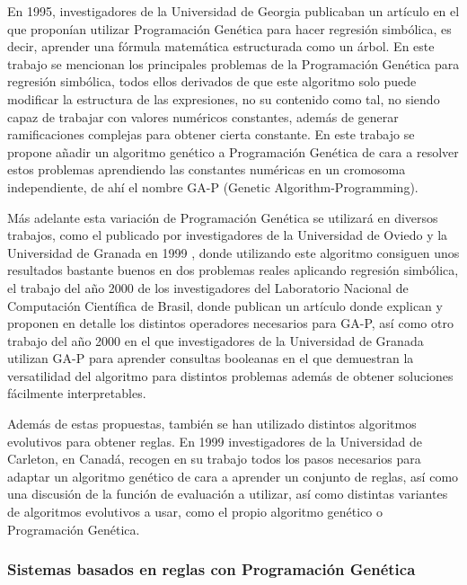 En 1995, investigadores de la Universidad de Georgia publicaban un artículo \cite{primerGAP} en el que proponían utilizar Programación Genética para hacer regresión simbólica, es decir, aprender una fórmula matemática estructurada como un árbol. En este trabajo se mencionan los principales problemas de la Programación Genética para regresión simbólica, todos ellos derivados de que este algoritmo solo puede modificar la estructura de las expresiones, no su contenido como tal, no siendo capaz de trabajar con valores numéricos constantes, además de generar ramificaciones complejas para obtener cierta constante. En este trabajo se propone añadir un algoritmo genético a Programación Genética de cara a resolver estos problemas aprendiendo las constantes numéricas en un cromosoma independiente, de ahí el nombre GA-P (Genetic Algorithm-Programming).

Más adelante esta variación de Programación Genética se utilizará en diversos trabajos, como el publicado por investigadores de la Universidad de Oviedo y la Universidad de Granada en 1999 \cite{GAPredElectrica}, donde utilizando este algoritmo consiguen unos resultados bastante buenos en dos problemas reales aplicando regresión simbólica, el trabajo del año 2000 de los investigadores del Laboratorio Nacional de Computación Científica de Brasil, donde publican un artículo \cite{PGregresionSimbolica} donde explican y proponen en detalle los distintos operadores necesarios para GA-P, así como otro trabajo del año 2000 en el que investigadores de la Universidad de Granada utilizan GA-P para aprender consultas booleanas \cite{GAPFormulasBooleanas} en el que demuestran la versatilidad del algoritmo para distintos problemas además de obtener soluciones fácilmente interpretables.

Además de estas propuestas, también se han utilizado distintos algoritmos evolutivos para obtener reglas. En 1999 investigadores de la Universidad de Carleton, en Canadá, recogen en su trabajo \cite{reglasUsandoGeneticos} todos los pasos necesarios para adaptar un algoritmo genético de cara a aprender un conjunto de reglas, así como una discusión de la función de evaluación a utilizar, así como distintas variantes de algoritmos evolutivos a usar, como el propio algoritmo genético o Programación Genética.


\subsubsection{Sistemas basados en reglas con Programación Genética}


